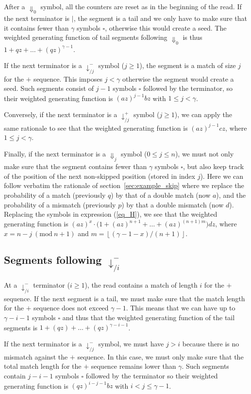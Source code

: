 \documentclass{article}
\newcommand{\modulo}[1]{\ (\mathrm{mod}\ #1)}
\begin{document}
After a $\Downarrow_0$ symbol, all the counters are reset as in the
beginning of the read. If the next terminator is $|$, the segment is a
tail and we only have to make sure that it contains fewer than $\gamma$
symbols $\square$, otherwise this would create a seed. The weighted
generating function of tail segments following $\Downarrow_0$ is thus $1 +
qz + \ldots + (qz)^{\gamma-1}$.

If the next terminator is a $\downarrow_{/j}^-$ symbol ($j \geq 1$), the
segment is a match of size $j$ for the $+$ sequence. This imposes $j <
\gamma$ otherwise the segment would create a seed. Such segments consist
of $j-1$ symbols $\square$ followed by the terminator, so their weighted
generating function is $(az)^{j-1}bz$ with $1 \leq j < \gamma$.

Conversely, if the next terminator is a $\downarrow_{/j}^+$ symbol ($j
\geq 1$), we can apply the same rationale to see that the weighted
generating function is $(az)^{j-1}cz$, where $1 \leq j < \gamma$.

Finally, if the next terminator is a $\Downarrow_j$ symbol ($0 \leq j \leq
n$), we must not only make sure that the segment contains fewer than
$\gamma$ symbols $\square$, but also keep track of the position of the
next non-skipped position (stored in index $j$). Here we can follow
verbatim the rationale of section~\ref{sec:example_skip} where we replace
the probability of a match (previously $q$) by that of a double match (now
$a$), and the probability of a mismatch (previously $p$) by that a double
mismatch (now $d$). Replacing the symbols in expression (\ref{eq_H}), we
see that the weighted generating function is $(az)^x \cdot \big( 1 +
(az)^{n+1} + \ldots + (az)^{(n+1)m} \big) dz$, where  $x = n-j
\modulo{n+1}$ and $m = \left\lfloor (\gamma-1-x) / (n+1) \right\rfloor$.


\subsection{Segments following $\downarrow_{/i}^-$}

At a $\downarrow_{/i}^-$ terminator ($i \geq 1$), the read contains a
match of length $i$ for the $+$ sequence. If the next segment is a tail,
we must make sure that the match length for the $+$ sequence does not
exceed $\gamma-1$. This means that we can have up to $\gamma-i-1$ symbols
$\square$ and thus that the weighted generating function of the tail
segments is $1 + (qz) + \ldots + (qz)^{\gamma-i-1}$.

If the next terminator is a $\downarrow_{/j}^-$ symbol, we must have $j >
i$ because there is no mismatch against the $+$ sequence. In this case, we
must only make sure that the total match length for the $+$ sequence
remains lower than $\gamma$. Such segments contain $j-i-1$ symbols
$\square$ followed by the terminator so their weighted generating function
is $(qz)^{i-j-1}bz$ with $i < j \leq \gamma-1$.
\end{document}
